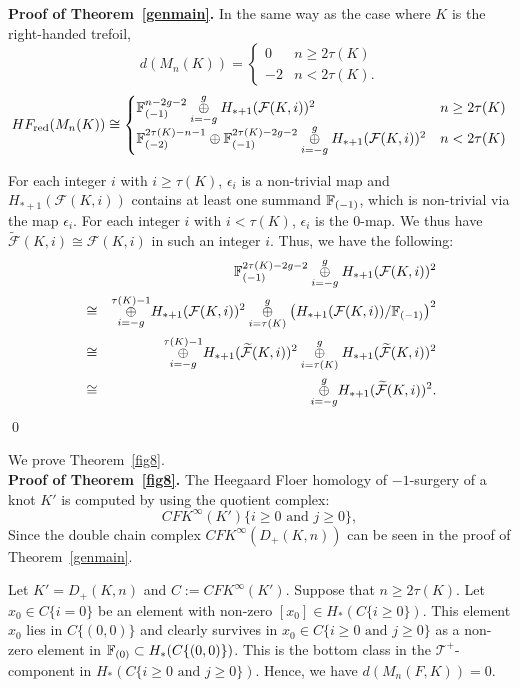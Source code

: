 \documentclass[11pt]{amsart}
\begin{document}
{\bf Proof of Theorem~\ref{genmain}.}
In the same way as the case where $K$ is the right-handed trefoil,
$$d(M_n(K))=\begin{cases}0&n\ge 2\tau(K)\\-2&n<2\tau(K).\end{cases}$$
$$HF_{\text{\normalfont red}}(M_n(K))\cong\begin{cases}
{\Bbb F}_{(-1)}^{n-2g-2}\overset{g}{\underset{i=-g}{\oplus}}H_{\ast+1}({\mathcal F}(K,i))^2&n\ge 2\tau(K)\\
{\Bbb F}_{(-2)}^{2\tau(K)-n-1}\oplus{\Bbb F}_{(-1)}^{2\tau(K)-2g-2}\overset{g}{\underset{i=-g}{\oplus}}H_{\ast+1}({\mathcal F}(K,i))^2&n< 2\tau(K)
\end{cases}
$$

For each integer $i$ with $i\ge \tau(K)$, $\epsilon_i$ is a non-trivial map and $H_{\ast+1}({\mathcal F}(K,i))$ contains at least one summand ${\Bbb F}_{(-1)}$,
which is non-trivial via the map $\epsilon_i$.
For each integer $i$ with $i<\tau(K)$, $\epsilon_i$ is the 0-map.
We thus have $\widetilde{\mathcal F}(K,i)\cong {\mathcal F}(K,i)$ in such an integer $i$.
Thus, we have the following:
\begin{eqnarray*}
&&{\Bbb F}_{(-1)}^{2\tau(K)-2g-2}\overset{g}{\underset{i=-g}{\oplus}}H_{\ast+1}({\mathcal F}(K,i))^2\\
&\cong&\overset{\tau(K)-1}{\underset{i=-g}{\oplus}}H_{\ast+1}({\mathcal F}(K,i))^2\overset{g}{\underset{i=\tau(K)}{\oplus}}\left(H_{\ast+1}({\mathcal F}(K,i))/{\Bbb F}_{(-1)}\right)^2\\
&\cong&\overset{\tau(K)-1}{\underset{i=-g}{\oplus}}H_{\ast+1}(\widetilde{\mathcal F}(K,i))^2\overset{g}{\underset{i=\tau(K)}{\oplus}}H_{\ast+1}(\widetilde{\mathcal F}(K,i))^2\\
&\cong&\overset{g}{\underset{i=-g}{\oplus}}H_{\ast+1}(\widetilde{\mathcal F}(K,i))^2.
\end{eqnarray*}
\hfill\qed

We prove Theorem~\ref{fig8}.\\
{\bf Proof of Theorem~\ref{fig8}.}
The Heegaard Floer homology of $-1$-surgery of a knot $K'$ is computed by using the quotient complex:
$$CFK^\infty(K')\{i\ge 0\text{ and }j\ge 0\},$$
Since the double chain complex $CFK^\infty(D_+(K,n))$ can be seen in the proof of Theorem~\ref{genmain}.

Let $K'=D_+(K,n)$ and $C:=CFK^\infty(K')$.
Suppose that $n\ge 2\tau(K)$.
Let $x_0\in C\{i=0\}$ be an element with non-zero $[x_0]\in H_\ast(C\{i\ge 0\})$.
This element $x_0$ lies in $C\{(0,0)\}$ and clearly survives in $x_0\in C\{i\ge0 \text{ and }j\ge 0\}$ as a non-zero element in ${\Bbb F}_{(0)}\subset H_\ast(C\{(0,0)\})$.
This is the bottom class in the ${\mathcal T}^+$-component in $H_\ast(C\{i\ge 0\text{ and }j\ge 0\})$.
Hence, we have $d(M_n(F,K))=0$.
\end{document}
